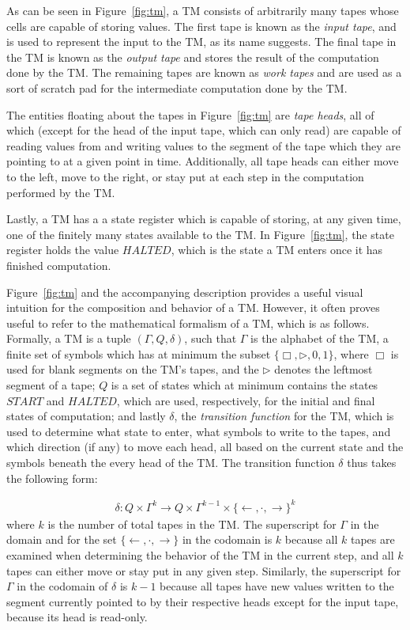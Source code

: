 \documentclass[usletter]{article}
\begin{document}
As can be seen in Figure~\ref{fig:tm}, a TM consists of arbitrarily many tapes whose cells are capable of storing values. The first tape is known as the \emph{input tape}, and is used to represent the input to the TM, as its name suggests. The final tape in the TM is known as the \emph{output tape} and stores the result of the computation done by the TM. The remaining tapes are known as \emph{work tapes} and are used as a sort of scratch pad for the intermediate computation done by the TM.

The entities floating about the tapes in Figure~\ref{fig:tm} are \emph{tape heads}, all of which (except for the head of the input tape, which can only read) are capable of reading values from and writing values to the segment of the tape which they are pointing to at a given point in time. Additionally, all tape heads can either move to the left, move to the right, or stay put at each step in the computation performed by the TM.

Lastly, a TM has a a state register which is capable of storing, at any given time, one of the finitely many states available to the TM. In Figure~\ref{fig:tm}, the state register holds the value $HALTED$, which is the state a TM enters once it has finished computation.

Figure~\ref{fig:tm} and the accompanying description provides a useful visual intuition for the composition and behavior of a TM. However, it often proves useful to refer to the mathematical formalism of a TM, which is as follows. Formally, a TM is a tuple $(\Gamma, Q, \delta)$, such that $\Gamma$ is the alphabet of the TM, a finite set of symbols which has at minimum the subset $\{\Box, \rhd, 0, 1\}$, where $\Box$ is used for blank segments on the TM's tapes, and the $\rhd$ denotes the leftmost segment of a tape; $Q$ is a set of states which at minimum contains the states $START$ and $HALTED$, which are used, respectively, for the initial and final states of computation; and lastly $\delta$, the \emph{transition function} for the TM, which is used to determine what state to enter, what symbols to write to the tapes, and which direction (if any) to move each head, all based on the current state and the symbols beneath the every head of the TM. The transition function $\delta$ thus takes the following form: 

\begin{align}
\delta : Q \times \Gamma^k \rightarrow Q \times \Gamma^{k-1}\times \{\leftarrow, \cdot, \rightarrow\}^k
\end{align}
where $k$ is the number of total tapes in the TM. The superscript for $\Gamma$ in the domain and for the set $\{\leftarrow, \cdot, \rightarrow\}$ in the codomain is $k$ because all $k$ tapes are examined when determining the behavior of the TM in the current step, and all $k$ tapes can either move or stay put in any given step. Similarly, the superscript for $\Gamma$ in the codomain of $\delta$ is $k-1$ because all tapes have new values written to the segment currently pointed to by their respective heads except for the input tape, because its head is read-only.
\end{document}
